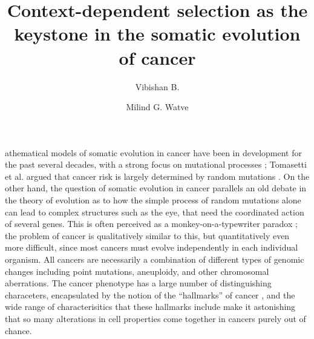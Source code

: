 \documentclass[9pt,onecolumn,twoside]{pnas-new}
\title{Context-dependent selection as the keystone in the somatic evolution of cancer}
\author[1,2]{Vibishan B.}
\author[1,2,*]{Milind G. Watve}
\affil[1]{Department of Biology, Indian Institute of Science Education and Research (IISER), Pune}
\begin{document}
\maketitle
\thispagestyle{firststyle}

athematical models of somatic evolution in cancer have been in development for the past several decades, with a strong focus on mutational processes \cite{ARMITAGE1954, McFarland2013, Blokzijl2016, Mina2017}; Tomasetti et al. argued that cancer risk is largely determined by random mutations \cite{Tomasetti78, Tomasetti2017}. On the other hand, the question of somatic evolution in cancer parallels an old debate in the theory of evolution as to how the simple process of random mutations alone can lead to complex structures such as the eye, that need the coordinated action of several genes. This is often perceived as a monkey-on-a-typewriter paradox \cite{Dawkins1996}; the problem of cancer is qualitatively similar to this, but quantitatively even more difficult, since most cancers must evolve independently in each individual organism. All cancers are necessarily a combination of different types of genomic changes including point mutations, aneuploidy, and other chromosomal aberrations. The cancer phenotype has a large number of distinguishing characeters, encapsulated by the notion of the ``hallmarks'' of cancer \cite{Hanahan2000, Schafer2008, Hanahan2011}, and the wide range of characterisitics that these hallmarks include make it astonishing that so many alterations in cell properties come together in cancers purely out of chance.
\end{document}
